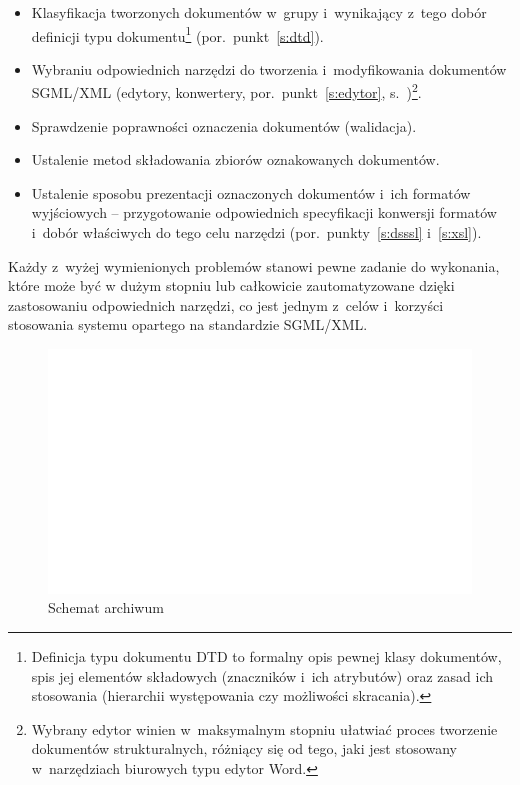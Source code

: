 \documentclass[skorowidz,brudnopis,xodstep]{xmgr}
\begin{document}
\begin{itemize}
\item Klasyfikacja tworzonych dokumentów w~grupy i~wynikający z~tego
  dobór definicji typu dokumentu\footnote{Definicja typu dokumentu DTD
    to formalny opis pewnej klasy dokumentów, spis jej elementów
    składowych (znaczników i~ich atrybutów) oraz zasad ich stosowania
    (hierarchii występowania czy możliwości skracania).}
  (por.~punkt~\ref{s:dtd}).
\item Wybraniu odpowiednich narzędzi do tworzenia i~modyfikowania
  dokumentów SGML/XML (edytory, konwertery, por.~punkt~\ref{s:edytor},
  s.~\pageref{s:edytor})\footnote{Wybrany edytor winien w~maksymalnym
    stopniu ułatwiać proces tworzenie dokumentów strukturalnych,
    różniący się od tego, jaki jest stosowany w~narzędziach biurowych
    typu edytor Word.}.
\item Sprawdzenie poprawności oznaczenia dokumentów
  (walidacja).
\item Ustalenie metod składowania zbiorów oznakowanych dokumentów.
\item Ustalenie sposobu prezentacji oznaczonych dokumentów i~ich
  formatów wyjściowych -- przygotowanie odpowiednich specyfikacji
  konwersji formatów i~dobór właściwych do tego celu narzędzi
  (por.~punkty~\ref{s:dsssl} i~\ref{s:xsl}).
\end{itemize}

Każdy z~wyżej wymienionych problemów stanowi pewne zadanie do
wykonania, które może być w dużym stopniu lub całkowicie
zautomatyzowane dzięki zastosowaniu odpowiednich narzędzi, co jest
jednym z~celów i~korzyści stosowania systemu opartego na standardzie
SGML/XML.

\begin{figure}[!tbh]
\centering 
\includegraphics[width=.8\hsize]{schemat}
\caption{Schemat archiwum\label{RYS.2}}
\end{figure}
\end{document}
